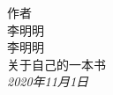\begin{titlepage}
  \raggedleft
  {\Large 作者\\ 李明明\\[1in] }
  {\Huge\scshape 李明明\\[.2in]}
  {\large 关于自己的一本书\\}
  \vfill
  {\itshape 2020年11月1日}
\end{titlepage}

